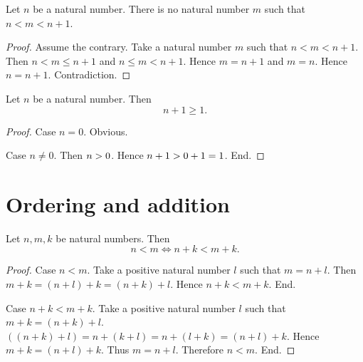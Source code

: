 \documentclass[../arithmetic.tex]{subfiles}
\begin{document}
  \begin{forthel}
    \begin{corollary}
      Let $n$ be a natural number.
      There is no natural number $m$ such that $n \less m \less n \plus 1$.
    \end{corollary}
    \begin{proof}
      Assume the contrary.
      Take a natural number $m$ such that $n \less m \less n \plus 1$.
      Then $n \less m \leq n \plus 1$ and $n \leq m \less n \plus 1$.
      Hence $m = n \plus 1$ and $m = n$.
      Hence $n = n \plus 1$.
      Contradiction.
    \end{proof}
  \end{forthel}

  \begin{forthel}
    \begin{proposition}
      Let $n$ be a natural number.
      Then \[ n \plus 1 \geq 1. \]
    \end{proposition}
    \begin{proof}
      Case $n = 0$. Obvious.

      Case $n \neq 0$.
        Then $n > 0$.
        Hence $n + 1 > 0 + 1 = 1$.
      End.
    \end{proof}
  \end{forthel}


  \section{Ordering and addition}

  \begin{forthel}
    \begin{proposition}
      Let $n, m, k$ be natural numbers.
      Then \[ n \less m \iff n \plus k \less m \plus k. \]
    \end{proposition}
    \begin{proof}
      Case $n \less m$.
        Take a positive natural number $l$ such that $m = n \plus l$.
        Then $m \plus k
          = (n \plus l) \plus k
          = (n \plus k) \plus l$.
        Hence $n \plus k \less m \plus k$.
      End.

      Case $n \plus k \less m \plus k$.
        Take a positive natural number $l$ such that $m \plus k = (n \plus k) \plus l$.
        $((n \plus k) \plus l)
          = n \plus (k \plus l)
          = n \plus (l \plus k)
          = (n \plus l) \plus k$.
        Hence $m \plus k = (n \plus l) \plus k$.
        Thus $m = n \plus l$.
        Therefore $n \less m$.
      End.
    \end{proof}
  \end{forthel}
\end{document}
